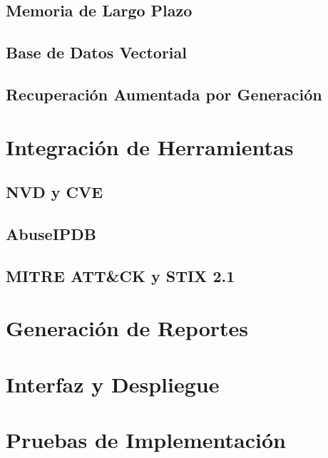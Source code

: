 \subsection{Memoria de Largo Plazo}

\subsection{Base de Datos Vectorial}

\subsection{Recuperación Aumentada por Generación}

\section{Integración de Herramientas}

\subsection{NVD y CVE}

\subsection{AbuseIPDB}

\subsection{MITRE ATT\&CK y STIX 2.1}

\section{Generación de Reportes}

\section{Interfaz y Despliegue}

\section{Pruebas de Implementación}